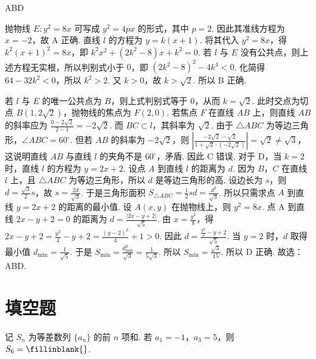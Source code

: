 \begin{answer}
ABD
\end{answer}

\begin{solution}
抛物线 \(E:y^2=8x\) 可写成 \(y^2=4px\) 的形式，其中 \(p=2\). 因此其准线方程为 \(x=-2\)，故 A 正确.
直线 \(l\) 的方程为 \(y=k\left( x+1 \right)\). 将其代入 \(y^2=8x\)，得 \(k^2\left( x+1 \right)^2=8x\)，即 \(k^2x^2+\left( 2k^2-8 \right)x+k^2=0\). 若 \(l\) 与 \(E\) 没有公共点，则上述方程无实根，所以判别式小于 \(0\)，即 \(\left( 2k^2-8 \right)^2-4k^4<0\). 化简得 \(64-32k^2<0\)，所以 \(k^2>2\). 又 \(k>0\)，故 \(k>\sqrt{2}\). 所以 B 正确.

若 \(l\) 与 \(E\) 的唯一公共点为 \(B\)，则上式判别式等于 \(0\)，从而 \(k=\sqrt{2}\). 此时交点为切点 \(B\left( 1,2\sqrt{2} \right)\)，抛物线的焦点为 \(F\left( 2,0 \right)\). 若焦点 \(F\) 在直线 \(AB\) 上，则直线 \(AB\) 的斜率应为 \(\frac{0-2\sqrt{2}}{2-1}=-2\sqrt{2}\). 而 \(BC\subset l\)，其斜率为 \(\sqrt{2}\). 由于 \(\triangle ABC\) 为等边三角形，\(\angle ABC=60^\circ\). 但若 \(AB\) 的斜率为 \(-2\sqrt{2}\)，则 \(\left| \frac{-2\sqrt{2}-\sqrt{2}}{1+\sqrt{2}\cdot \left( -2\sqrt{2} \right)} \right|=\sqrt{2}\ne \sqrt{3}\)，
这说明直线 \(AB\) 与直线 \(l\) 的夹角不是 \(60^\circ\)，矛盾. 因此 C 错误.
对于 D，当 \(k=2\) 时，直线 \(l\) 的方程为 \(y=2x+2\). 设点 \(A\) 到直线 \(l\) 的距离为 \(d\). 因为 \(B\)，\(C\) 在直线 \(l\) 上，且 \(\triangle ABC\) 为等边三角形，所以 \(d\) 是等边三角形的高. 设边长为 \(s\)，则 \(d=\frac{\sqrt{3}}{2}s\)，故 \(s=\frac{2d}{\sqrt{3}}\). 于是三角形面积 \(S_{\triangle ABC}=\frac{1}{2}sd=\frac{d^2}{\sqrt{3}}\). 所以只需求点 \(A\) 到直线 \(y=2x+2\) 的距离的最小值.
设 \(A(x,y)\) 在抛物线上，则 \(y^2=8x\). 点 A 到直线 \(2x-y+2=0\) 的距离为 \(d=\frac{\left| 2x-y+2 \right|}{\sqrt{5}}\). 由 \(x=\frac{y^2}{8}\)，得 \(2x-y+2=\frac{y^2}{4}-y+2=\frac{\left( y-2 \right)^2}{4}+1>0\). 因此 \(d=\frac{\frac{y^2}{4}-y+2}{\sqrt{5}}\). 当 \(y=2\) 时，\(d\) 取得最小值 \(d_{\min}=\frac{1}{\sqrt{5}}\). 于是 \(S_{\min}=\frac{d_{\min}^2}{\sqrt{3}}=\frac{1}{5\sqrt{3}}\). 所以 \(S_{\min}=\frac{\sqrt{3}}{15}\).
所以 D 正确.
故选：ABD.
\end{solution}
\section{填空题}

\begin{problem}
记 \(S_n\) 为等差数列 \(\{a_n\}\) 的前 \(n\) 项和. 若 \(a_1=-1\)，\(a_3=5\)，则 \(S_6=\fillinblank{}\).
\end{problem}


